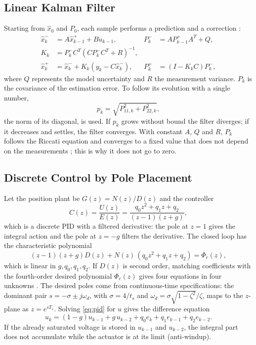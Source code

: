 \documentclass[conference,a4paper]{IEEEtran}
\begin{document}
\subsection{Linear Kalman Filter}
Starting from $\hat{x}_0$ and $P_0$, each sample performs a prediction and a correction \cite{welch}:
\begin{align}
\hat{x}_k^- &= A\hat{x}_{k-1}^+ + B u_{k-1}, & P_k^- &= A P_{k-1}^+ A^T + Q,\\
K_k &= P_k^- C^T (C P_k^- C^T + R)^{-1}, & &\\
\hat{x}_k^+ &= \hat{x}_k^- + K_k(y_k - C\hat{x}_k^-), & P_k^+ &= (I-K_kC)P_k^- ,
\end{align}
where $Q$ represents the model uncertainty and $R$ the measurement variance. $P_k$ is the covariance of the estimation error. To follow its evolution with a single number,
\begin{equation}
p_k=\sqrt{P_{11,k}^2+P_{22,k}^2},
\label{eq:traza}
\end{equation}
the norm of its diagonal, is used. If $p_k$ grows without bound the filter diverges; if it decreases and settles, the filter converges. With constant $A$, $Q$ and $R$, $P_k$ follows the Riccati equation and converges to a fixed value that does not depend on the measurements \cite{welch}; this is why it does not go to zero.

\subsection{Discrete Control by Pole Placement}
Let the position plant be $G(z)=N(z)/D(z)$ and the controller
\begin{equation}
C(z)=\frac{U(z)}{E(z)}=\frac{q_0z^2+q_1z+q_2}{(z-1)(z+g)},
\label{eq:pid}
\end{equation}
which is a discrete PID with a filtered derivative: the pole at $z=1$ gives the integral action and the pole at $z=-g$ filters the derivative. The closed loop has the characteristic polynomial
\begin{equation}
(z-1)(z+g)D(z)+N(z)\,(q_0z^2+q_1z+q_2)=\Phi_c(z),
\label{eq:diof}
\end{equation}
which is linear in $g,q_0,q_1,q_2$. If $D(z)$ is second order, matching coefficients with the fourth-order desired polynomial $\Phi_c(z)$ gives four equations in four unknowns \cite{astrom}. The desired poles come from continuous-time specifications: the dominant pair $s=-\sigma\pm j\omega_d$, with $\sigma=4/t_s$ and $\omega_d=\sigma\sqrt{1-\zeta^2}/\zeta$, maps to the $z$-plane as $z=e^{sT_s}$. Solving \eqref{eq:pid} for $u$ gives the difference equation
\begin{equation}
u_k=(1-g)u_{k-1}+g\,u_{k-2}+q_0e_k+q_1e_{k-1}+q_2e_{k-2}.
\label{eq:dif}
\end{equation}
If the already saturated voltage is stored in $u_{k-1}$ and $u_{k-2}$, the integral part does not accumulate while the actuator is at its limit (anti-windup).
\end{document}
